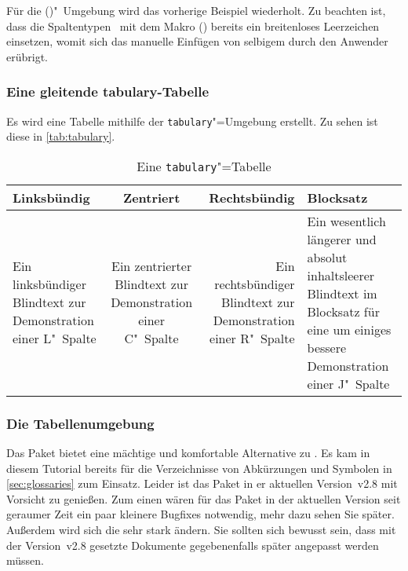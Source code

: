 \documentclass[%
  english,ngerman,%
  cdgeometry=no,DIV=12,automark%
]{tudscrartcl}
\begin{document}
Für die ()"~Umgebung wird das vorherige 
Beispiel wiederholt. Zu beachten ist, dass die Spaltentypen~ mit 
dem Makro () bereits ein breitenloses 
Leerzeichen einsetzen, womit sich das manuelle Einfügen von selbigem durch den 
Anwender erübrigt.
%
\begin{Trunk+}
\subsubsection{Eine gleitende tabulary-Tabelle}
Es wird eine Tabelle mithilfe der \texttt{tabulary}"=Umgebung erstellt. 
Zu sehen ist diese in \autoref{tab:tabulary}. 

\end{Trunk+}
\begin{Trunk}
\begin{table}
\begin{tabulary}{\textwidth}{@{}LCRJ@{}}
\toprule
\textbf{Linksbündig} & \textbf{Zentriert} & 
\textbf{Rechtsbündig} & \textbf{Blocksatz} \tabularnewline\midrule
Ein linksbündiger Blindtext zur Demonstration einer L"~Spalte &
Ein zentrierter Blindtext zur Demonstration einer C"~Spalte &
Ein rechtsbündiger Blindtext zur Demonstration einer R"~Spalte &
Ein wesentlich längerer und absolut inhaltsleerer Blindtext im 
Blocksatz für eine um einiges bessere Demonstration einer J"~Spalte
\tabularnewline\bottomrule
\end{tabulary}
\caption{Eine \texttt{tabulary}"=Tabelle}\label{tab:tabulary}
\end{table}

\end{Trunk}
\InputCode


\subsubsection{Die Tabellenumgebung }
\label{sec:tabu}%
%
Das Paket  bietet eine mächtige und komfortable Alternative zu 
. Es kam in diesem Tutorial bereits für die Verzeichnisse von 
Abkürzungen und Symbolen in \autoref{sec:glossaries} zum Einsatz. Leider ist 
das Paket in er aktuellen Version~v2.8 mit Vorsicht zu genießen. Zum einen
wären für das Paket in der aktuellen Version seit geraumer Zeit ein paar 
kleinere Bugfixes notwendig, mehr dazu sehen Sie später. Außerdem wird sich die 
sehr stark ändern. Sie sollten sich bewusst sein, dass mit der Version~v2.8
gesetzte Dokumente gegebenenfalls später angepasst werden müssen.
\end{document}
